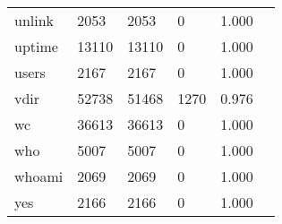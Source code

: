 \begin{longtable}{lp{2.4cm}p{2.4cm}p{2.4cm}p{2.4cm}p{2.4cm}}
unlink    &                                    2053 &                        2053 &                            0 &                                   1.000 \\
uptime    &                                   13110 &                       13110 &                            0 &                                   1.000 \\
users     &                                    2167 &                        2167 &                            0 &                                   1.000 \\
vdir      &                                   52738 &                       51468 &                         1270 &                                   0.976 \\
wc        &                                   36613 &                       36613 &                            0 &                                   1.000 \\
who       &                                    5007 &                        5007 &                            0 &                                   1.000 \\
whoami    &                                    2069 &                        2069 &                            0 &                                   1.000 \\
yes       &                                    2166 &                        2166 &                            0 &                                   1.000 \\
\end{longtable}
